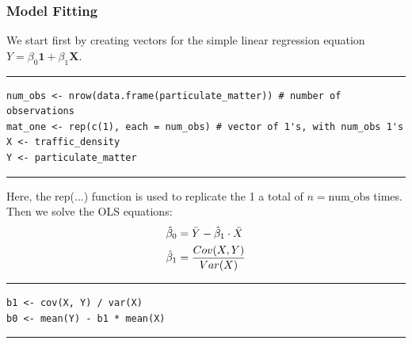 \documentclass{article}
\begin{document}
\subsubsection*{Model Fitting}
We start first by creating vectors for the simple linear regression equation $Y = \beta_0\mathbf{1} + \beta_1 \mathbf{X}$.
\par\noindent\rule{\textwidth}{0.4pt}
\vspace{-25pt} %
\begin{verbatim}
num_obs <- nrow(data.frame(particulate_matter)) # number of observations
mat_one <- rep(c(1), each = num_obs) # vector of 1's, with num_obs 1's
X <- traffic_density
Y <- particulate_matter
\end{verbatim}
\vspace{-15pt} %
\par\noindent\rule{\textwidth}{0.4pt}
Here, the rep(...) function is used to replicate the 1 a total of $n = \text{num\_obs}$ times. Then we solve the OLS equations: 
\begin{align}
    \hat{\beta} _0 & = \bar{Y} - \hat{\beta} _1 \cdot \bar{X} \notag \\ 
    \hat{\beta} _1 & = \frac{Cov(X,Y)}{Var(X)} \notag
\end{align}

\par\noindent\rule{\textwidth}{0.4pt}
\vspace{-25pt} %
\begin{verbatim}
b1 <- cov(X, Y) / var(X)
b0 <- mean(Y) - b1 * mean(X)
\end{verbatim}
\vspace{-15pt} %
\par\noindent\rule{\textwidth}{0.4pt}
\end{document}
